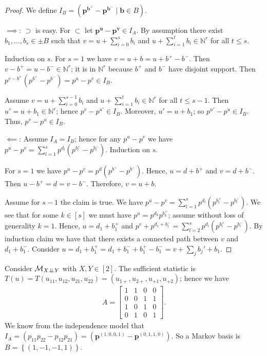 \begin{proof}
  We define \( I_B = (\mathbf p^{\mathbf{b}^+} - \mathbf p^{\mathbf{b}^-} \mid \mathbf{b} \in B) \).

  \( \implies \): \( \supset \) is easy. For \( \subset \) let \( \mathbf{p}^{\mathbf{u}} - \mathbf{p}^{\mathbf{v}} \in I_A \). By assumption there exist \( b_1, \dots, b_s \in \pm B \) such that \( v = u + \sum^{s}_{i=0} b_i \) and \( u + \sum^{t}_{i=1} b_i \in \mathbb{N}^r \) for all \( t \leq s \). 
  
  Induction on \( s \). For \( s=1 \) we have \( v = u + b = u + b^+ - b^-\). Then \( v - b^+ = u - b^- \in \mathbb{N}^r \); it is in \( \mathbb{N}^r \) because \( b^+ \) and \( b^- \) have disjoint support. Then \( p^{v - b^+}(p^{b^+} - p^{b^-}) = p^{u} - p^{v} \in I_B \). 
  
  Assume  \( v = u + \sum^{s-1}_{i=0} b_i \) and \( u + \sum^{t}_{i=1} b_i \in \mathbb{N}^r \) for all \( t \leq s-1 \). Then \( u' = u + b_1 \in \mathbb{N}^r \); hence \( p^v - p^{u'} \in I_B \). Moreover, \( u' = u + b_1 \); so \( p^{u'} - p^{u} \in I_B \). Thus, \( p^v - p^{u} \in I_B \).

  \( \impliedby \): Assume \( I_A = I_B \); hence for any \( p^{u} - p^{v} \) we have \( p^{u} - p^{v} = \sum_{l=1}^s p^{d_l}(p^{b_l^+} - p^{b_l^-}) \). Induction on \( s \).

  For \( s = 1 \) we have \( p^{u} - p^v = p^d(p^{b^+} - p^{b^-}) \). Hence, \( u = d + b^+ \) and \( v = d + b^- \). Then \( u - b^+ = d = v - b^- \). Therefore, \( v = u + b  \).

  Assume for \( s-1 \) the claim is true. We have \( p^{u} - p^{v} =\sum^s_{l=1} p^{d_l}(p^{b^+_l} - p^{b^-_l}) \). We see that for some \( k \in [s] \) we must have \( p^{u} = p^{d_k} p^{b_k^+} \); assume without loss of generality \( k= 1 \). Hence, \( u = d_1 + b_1^+ \) and \( p^v + p^{d_1 + b_1^-} = \sum^{s}_{l=2} p^{d_l}(p^{b_l^+}-p^{b_l^-})  \). By induction claim we have that there exists a connected path between \( v \) and \( d_1 + b_1^- \). Consider \( u = d_1+ b_1^+ = d_1 + b_1^- + b_1^+ - b_1^- = v + \sum_j b_j' + b_1 \).
\end{proof}

\begin{eg}
  Consider \( \mathcal{M}_{X \perp \!\!\! \perp Y} \) with \( X,Y \in [2] \). The sufficient statistic is \( T(u) = T(u_{11}, u_{12}, u_{21}, u_{22}) = (u_{1+}, u_{2+}, u_{+1}, u_{+2})  \); hence we have 
  \begin{align*}
    A = \begin{bmatrix}
      1 & 1 & 0 & 0 \\
      0 & 0 & 1 & 1 \\
      1 & 0 & 1 & 0 \\
      0 & 1 & 0 & 1
    \end{bmatrix}.
  \end{align*}
  We know from the independence model that \( I_A = (p_{11}p_{22} - p_{12}p_{21}) = (\mathbf{p}^{(1,0,0,1)} - \mathbf{p}^{(0,1,1,0)})\). So a Markov basis is \( B = \left\{ (1,-1,-1,1) \right\} \).
\end{eg}